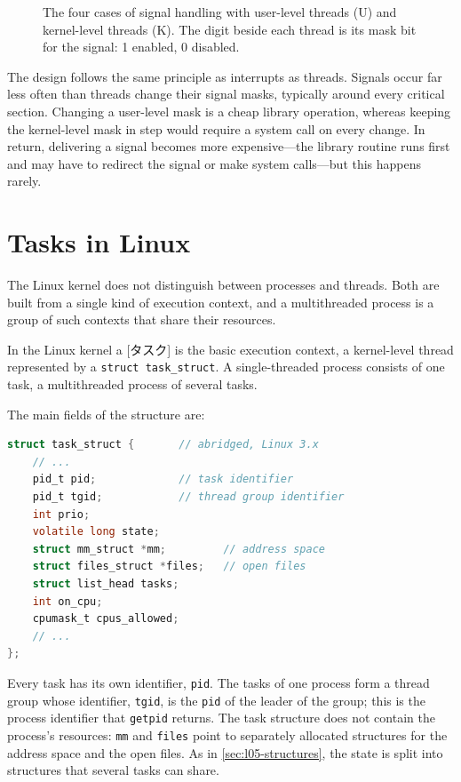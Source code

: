 \documentclass[../main.tex]{subfiles}
\begin{document}
\begin{figure}[htbp]
  \centering
  
  \caption{The four cases of signal handling with user-level threads (U)
    and kernel-level threads (K).  The digit beside each thread is its mask
    bit for the signal: 1 enabled, 0 disabled.}
  \label{fig:l05-signal-cases}
\end{figure}

The design follows the same principle as interrupts as threads.  Signals
occur far less often than threads change their signal masks, typically
around every critical section.  Changing a user-level mask is a cheap
library operation, whereas keeping the kernel-level mask in step would
require a system call on every change.  In return, delivering a signal
becomes more expensive---the library routine runs first and may have to
redirect the signal or make system calls---but this happens rarely.

\section{Tasks in Linux}
\label{sec:l05-linux}

The Linux kernel does not distinguish between processes and
threads.  Both are built from a single kind of execution context, and a
multithreaded process is a group of such contexts that share their
resources.

\begin{definition}[Task]
  In the Linux kernel a [タスク] is the basic execution
  context, a kernel-level thread represented by a
  \texttt{struct task\_struct}.  A single-threaded process consists of one
  task, a multithreaded process of several tasks.
\end{definition}

The main fields of the structure are:
\begin{lstlisting}[language=C, numbers=none]
struct task_struct {       // abridged, Linux 3.x
    // ...
    pid_t pid;             // task identifier
    pid_t tgid;            // thread group identifier
    int prio;
    volatile long state;
    struct mm_struct *mm;         // address space
    struct files_struct *files;   // open files
    struct list_head tasks;
    int on_cpu;
    cpumask_t cpus_allowed;
    // ...
};
\end{lstlisting}
Every task has its own identifier, \texttt{pid}.  The tasks of one process
form a thread group whose identifier, \texttt{tgid}, is the \texttt{pid}
of the leader of the group; this is the process identifier that
\texttt{getpid} returns.  The task structure does not contain the
process's resources: \texttt{mm} and \texttt{files} point to separately
allocated structures for the address space and the open files.  As in
\cref{sec:l05-structures}, the state is split into structures that several
tasks can share.
\end{document}
